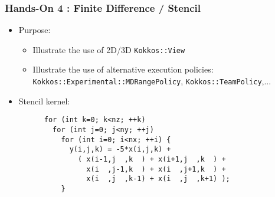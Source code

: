 \begin{frame}[fragile=singleslide]
  \frametitle{Hands-On 4 : Finite Difference / Stencil}

  \hypertarget{handson4}{}

  \begin{itemize}
  \item Purpose:
    \begin{itemize}
    \item Illustrate the use of 2D/3D \texttt{Kokkos::View}
    \item Illustrate the use of alternative execution policies: \texttt{Kokkos::Experimental::MDRangePolicy}, \texttt{Kokkos::TeamPolicy},...
    \end{itemize}
  \item Stencil kernel:
    \begin{verbatim}
      for (int k=0; k<nz; ++k)
        for (int j=0; j<ny; ++j)
          for (int i=0; i<nx; ++i) {
            y(i,j,k) = -5*x(i,j,k) +
              ( x(i-1,j  ,k  ) + x(i+1,j  ,k  ) +
                x(i  ,j-1,k  ) + x(i  ,j+1,k  ) +
                x(i  ,j  ,k-1) + x(i  ,j  ,k+1) );
          }
    \end{verbatim}
  \end{itemize}
  
\end{frame}